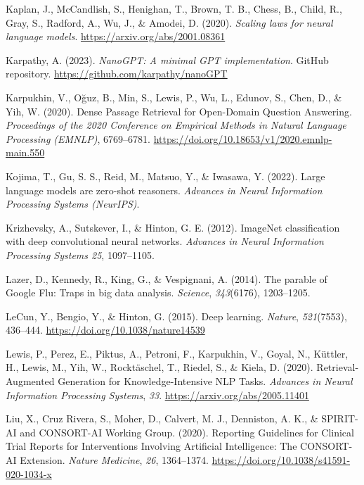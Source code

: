 \documentclass[
  letterpaper,
  11pt]{scrbook}
\newlength{\cslhangindent}
\newenvironment{CSLReferences}[2] %
 {\begin{list}{}{%
  \setlength{\itemindent}{0pt}
  \setlength{\leftmargin}{0pt}
  \setlength{\parsep}{0pt}
  \ifodd #1
   \setlength{\leftmargin}{\cslhangindent}
   \setlength{\itemindent}{-1\cslhangindent}
  \fi
  \setlength{\itemsep}{#2\baselineskip}}}
 {\end{list}}
\begin{document}
\begin{CSLReferences}{1}{0}
Kaplan, J., McCandlish, S., Henighan, T., Brown, T. B., Chess, B.,
Child, R., Gray, S., Radford, A., Wu, J., \& Amodei, D. (2020).
\emph{Scaling laws for neural language models}.
\url{https://arxiv.org/abs/2001.08361}

Karpathy, A. (2023). \emph{Nano{GPT}: A minimal {GPT} implementation}.
GitHub repository. \url{https://github.com/karpathy/nanoGPT}

Karpukhin, V., Oğuz, B., Min, S., Lewis, P., Wu, L., Edunov, S., Chen,
D., \& Yih, W. (2020). {Dense Passage Retrieval for Open-Domain Question
Answering}. \emph{Proceedings of the 2020 Conference on Empirical
Methods in Natural Language Processing (EMNLP)}, 6769--6781.
\url{https://doi.org/10.18653/v1/2020.emnlp-main.550}

Kojima, T., Gu, S. S., Reid, M., Matsuo, Y., \& Iwasawa, Y. (2022).
Large language models are zero-shot reasoners. \emph{Advances in Neural
Information Processing Systems (NeurIPS)}.

Krizhevsky, A., Sutskever, I., \& Hinton, G. E. (2012). {ImageNet}
classification with deep convolutional neural networks. \emph{Advances
in Neural Information Processing Systems 25}, 1097--1105.

Lazer, D., Kennedy, R., King, G., \& Vespignani, A. (2014). The parable
of {Google Flu}: Traps in big data analysis. \emph{Science},
\emph{343}(6176), 1203--1205.

LeCun, Y., Bengio, Y., \& Hinton, G. (2015). Deep learning.
\emph{Nature}, \emph{521}(7553), 436--444.
\url{https://doi.org/10.1038/nature14539}

Lewis, P., Perez, E., Piktus, A., Petroni, F., Karpukhin, V., Goyal, N.,
Küttler, H., Lewis, M., Yih, W., Rocktäschel, T., Riedel, S., \& Kiela,
D. (2020). {Retrieval-Augmented Generation for Knowledge-Intensive NLP
Tasks}. \emph{Advances in Neural Information Processing Systems},
\emph{33}. \url{https://arxiv.org/abs/2005.11401}

Liu, X., Cruz Rivera, S., Moher, D., Calvert, M. J., Denniston, A. K.,
\& SPIRIT-AI and CONSORT-AI Working Group. (2020). {Reporting Guidelines
for Clinical Trial Reports for Interventions Involving Artificial
Intelligence}: {The CONSORT-AI Extension}. \emph{Nature Medicine},
\emph{26}, 1364--1374. \url{https://doi.org/10.1038/s41591-020-1034-x}


\end{CSLReferences}
\end{document}
